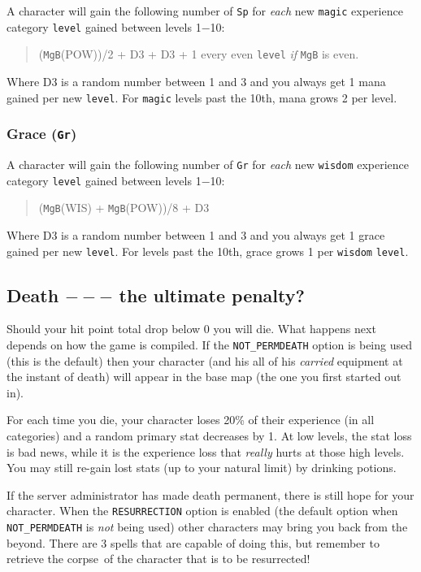 A character will gain the following number of {\tt Sp} for {\em each} new
{\tt magic} experience category {\tt level} gained between levels 1$-$10:
\begin{quote}
({\tt MgB}(POW))/2 + D3 + D3 + 1 every even {\tt level} {\em if} {\tt MgB} is even.
\end{quote}
Where D3 is a random number between 1 and 3 and you always get 1 mana gained
per new {\tt level}. For {\tt magic} levels past the 10th, mana grows 2 per level.
 

\subsubsection{Grace ({\tt Gr})} 

A character will gain the following number of {\tt Gr} for {\em each} new
{\tt wisdom} experience category {\tt level} gained between levels 1$-$10:
\begin{quote}
({\tt MgB}(WIS) + {\tt MgB}(POW))/8 + D3
\end{quote}
Where D3 is a random number between 1 and 3 and you always get 1 grace gained
per new {\tt level}. For levels past the 10th, 
grace grows 1 per {\tt wisdom} {\tt level}.

\subsection{Death $---$ the ultimate penalty?}\label{sec:death}

Should your hit point total drop below 0 you will die. 
What happens next depends on how the game is compiled. If the 
{\tt NOT\_PERMDEATH} option is being 
used (this is the default) then your character (and his all of his 
{\em carried}
equipment at the instant of death) will appear in the base map (the one
you first started out in). 

For each time you die, your character loses 20\%
of their experience (in all categories) and a random primary stat decreases by 1. 
At low levels, the stat loss is bad news, while it is the experience loss that
{\em really} hurts at those high levels. You may still re-gain lost stats (up to your
natural limit) by drinking potions.

If the server administrator has made death permanent, there is still hope
for your character. When the {\tt RESURRECTION} option is enabled (the default option
when {\tt NOT\_PERMDEATH} is {\em not} being used) other characters may bring you back
from the beyond. There are 3 spells that are capable of doing this, but
remember to retrieve the corpse\ of the character 
that is to be resurrected! 

